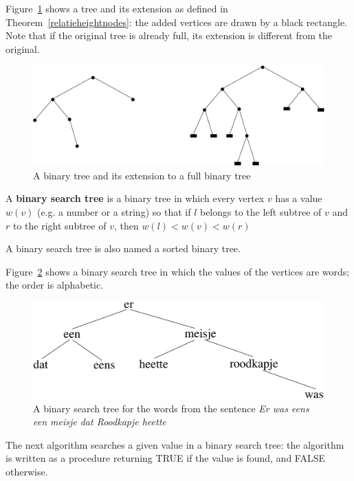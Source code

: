 Figure~\ref{uitbreiding1} shows a tree and its extension as defined in
Theorem~\ref{relatieheightnodes}: the added vertices are drawn by a
black rectangle. Note that if the original tree is already full, its
extension is different from the original.

\begin{figure}[ht]
\begin{center}
\includegraphics[width=0.6\linewidth,keepaspectratio]{uitbreiding1}
\end{center}
\caption{A binary tree and its extension to a full binary tree\label{uitbreiding1}}
\end{figure}

 \begin{definition}
\textup{A \textbf{binary search tree} is a binary tree in which every
vertex $v$ has a value $w(v)$ (e.g. a number or a string) so that
if $l$ belongs to the left subtree of $v$ and $r$ to the right subtree
of $v$, then  $w(l) < w(v) < w(r)$ }
\end{definition}


A binary search tree is also named a sorted binary tree.

Figure~\ref{binboom1} shows a binary search tree in which the values
of the vertices are words; the order is alphabetic.

\begin{figure}[ht]
\begin{center}
\includegraphics[width=0.6\linewidth,keepaspectratio]{binboom1}
\end{center}
\caption{A binary search tree for the words from the sentence
{\em Er was eens een meisje dat Roodkapje heette} \label{binboom1}}
\end{figure}

The next algorithm searches a given value in a binary search tree: the
algorithm is written as a procedure returning TRUE if the value is
found, and FALSE otherwise.


